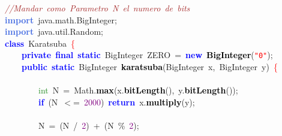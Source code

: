 {\ttfamily \raggedright {
\noindent
\mbox{}\textit{\textcolor{Brown}{//Mandar\ como\ Parametro\ N\ el\ numero\ de\ bits}} \\
\mbox{}\textbf{\textcolor{RoyalBlue}{import}}\ java\textcolor{BrickRed}{.}math\textcolor{BrickRed}{.}BigInteger\textcolor{BrickRed}{;} \\
\mbox{}\textbf{\textcolor{RoyalBlue}{import}}\ java\textcolor{BrickRed}{.}util\textcolor{BrickRed}{.}Random\textcolor{BrickRed}{;} \\
\mbox{}\textbf{\textcolor{Blue}{class}}\ \textcolor{TealBlue}{Karatsuba}\ \textcolor{Red}{\{} \\
\mbox{}\ \ \ \ \textbf{\textcolor{Blue}{private}}\ \textbf{\textcolor{Blue}{final}}\ \textbf{\textcolor{Blue}{static}}\ \textcolor{TealBlue}{BigInteger}\ ZERO\ \textcolor{BrickRed}{=}\ \textbf{\textcolor{Blue}{new}}\ \textbf{\textcolor{Black}{BigInteger}}\textcolor{BrickRed}{(}\texttt{\textcolor{Red}{"{}0"{}}}\textcolor{BrickRed}{);} \\
\mbox{}\ \ \ \ \textbf{\textcolor{Blue}{public}}\ \textbf{\textcolor{Blue}{static}}\ \textcolor{TealBlue}{BigInteger}\ \textbf{\textcolor{Black}{karatsuba}}\textcolor{BrickRed}{(}\textcolor{TealBlue}{BigInteger}\ x\textcolor{BrickRed}{,}\ \textcolor{TealBlue}{BigInteger}\ y\textcolor{BrickRed}{)}\ \textcolor{Red}{\{} \\
\mbox{}\ \ \ \ \ \ \ \ \\
\mbox{}\ \ \ \ \ \ \ \ \textcolor{ForestGreen}{int}\ N\ \textcolor{BrickRed}{=}\ Math\textcolor{BrickRed}{.}\textbf{\textcolor{Black}{max}}\textcolor{BrickRed}{(}x\textcolor{BrickRed}{.}\textbf{\textcolor{Black}{bitLength}}\textcolor{BrickRed}{(),}\ y\textcolor{BrickRed}{.}\textbf{\textcolor{Black}{bitLength}}\textcolor{BrickRed}{());} \\
\mbox{}\ \ \ \ \ \ \ \ \textbf{\textcolor{Blue}{if}}\ \textcolor{BrickRed}{(}N\ \textcolor{BrickRed}{$<$=}\ \textcolor{Purple}{2000}\textcolor{BrickRed}{)}\ \textbf{\textcolor{Blue}{return}}\ x\textcolor{BrickRed}{.}\textbf{\textcolor{Black}{multiply}}\textcolor{BrickRed}{(}y\textcolor{BrickRed}{);}\ \ \ \ \ \ \ \ \ \ \ \ \ \ \ \ \ \\
\mbox{}\ \ \ \ \ \ \ \ \\
\mbox{}\ \ \ \ \ \ \ \ N\ \textcolor{BrickRed}{=}\ \textcolor{BrickRed}{(}N\ \textcolor{BrickRed}{/}\ \textcolor{Purple}{2}\textcolor{BrickRed}{)}\ \textcolor{BrickRed}{+}\ \textcolor{BrickRed}{(}N\ \textcolor{BrickRed}{\%}\ \textcolor{Purple}{2}\textcolor{BrickRed}{);} \\
}}
